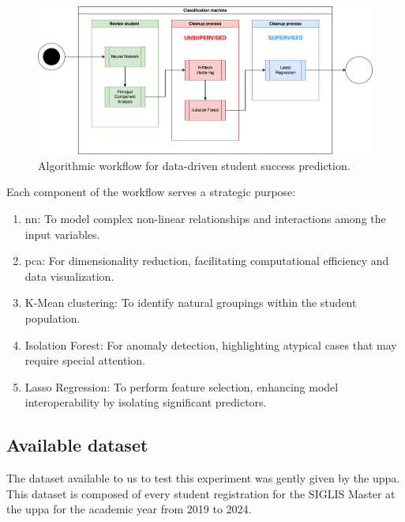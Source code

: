 \documentclass[../main.tex]{subfiles}
\begin{document}
\begin{figure}[H]
    \centering
    \includegraphics[width=1\linewidth]{res//diagram/ML Workflow.png}
    \caption{Algorithmic workflow for data-driven student success prediction.}
    \label{fig:dataworkflow}
\end{figure}

Each component of the workflow serves a strategic purpose:

\begin{enumerate}
    \item \acrfull{nn}: To model complex non-linear relationships and interactions among the input variables.
    \item \acrfull{pca}: For dimensionality reduction, facilitating computational efficiency and data visualization.
    \item K-Mean clustering: To identify natural groupings within the student population.
    \item Isolation Forest: For anomaly detection, highlighting atypical cases that may require special attention.
    \item Lasso Regression: To perform feature selection, enhancing model interoperability by isolating significant predictors.
\end{enumerate}

\subsection{Available dataset}
\label{subsec:available_ds}
The dataset available to us to test this experiment was gently given by the \acrfull{uppa}.
This dataset is composed of every student registration for the SIGLIS Master at the \acrshort{uppa} for the academic year from 2019 to 2024.
\end{document}
